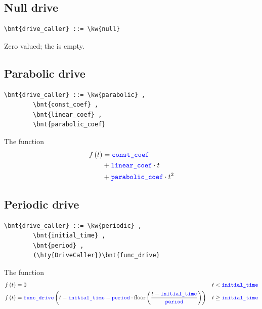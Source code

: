 \subsection{Null drive}
\begin{Verbatim}[commandchars=\\\{\}]
    \bnt{drive_caller} ::= \kw{null}
\end{Verbatim}
Zero valued; the  is empty.

\subsection{Parabolic drive}
\begin{Verbatim}[commandchars=\\\{\}]
    \bnt{drive_caller} ::= \kw{parabolic} ,
        \bnt{const_coef} , 
        \bnt{linear_coef} , 
        \bnt{parabolic_coef}
\end{Verbatim}
The function
\begin{align}
	f\left( t \right) &= \textcolor{blue}{\texttt{const\_coef}} \nonumber \\
		&+ \textcolor{blue}{\texttt{linear\_coef}} \cdot t \nonumber \\
		&+ \textcolor{blue}{\texttt{parabolic\_coef}} \cdot t^2
\end{align}

\subsection{Periodic drive}
\begin{Verbatim}[commandchars=\\\{\}]
    \bnt{drive_caller} ::= \kw{periodic} ,
        \bnt{initial_time} ,
        \bnt{period} ,
        (\hty{DriveCaller})\bnt{func_drive}
\end{Verbatim}
The function
\begin{align}
	f\left( t \right)
	&=
	0
	& t < \textcolor{blue}{\texttt{initial\_time}}
	\nonumber \\
	f\left( t \right)
	&=
	\textcolor{blue}{\texttt{func\_drive}}\left( 
		t
		-
		\textcolor{blue}{\texttt{initial\_time}}
		-
		\textcolor{blue}{\texttt{period}} \cdot \textrm{floor}\left( \frac{t - \textcolor{blue}{\texttt{initial\_time}}}{\textcolor{blue}{\texttt{period}}} \right)
	 \right)
	&
	t \ge \textcolor{blue}{\texttt{initial\_time}}
\end{align}

